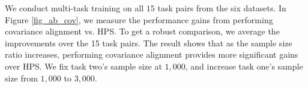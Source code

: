 We conduct multi-task training on all $15$ task pairs from the six datasets.
In Figure \ref{fig_ab_cov}, we measure the performance gains from performing covariance alignment vs. HPS.
To get a robust comparison, we average the improvements over the 15 task pairs.
The result shows that as the sample size ratio increases, performing covariance alignment provides more significant gains over HPS.
We fix task two's sample size at $1,000$, and increase task one's sample size from $1,000$ to $3,000$.






